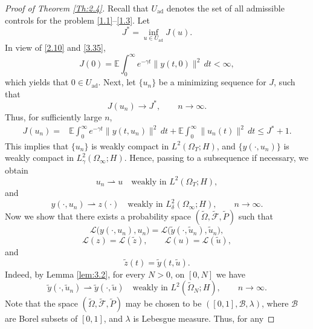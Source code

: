 \documentclass[a4paper,12pt]{article}
\numberwithin{equation}{section}
\begin{document}
\begin{proof}[Proof of Theorem \ref{Th:2.4}]
Recall that $U_{\mathrm{ad}}$ denotes the set of all admissible controls
for the problem \eqref{1.1}--\eqref{1.3}. Let
\[
J^*
=
\inf_{u\in U_{\mathrm{ad}}}J(u).
\] 
In view of \eqref{2.10} and
\eqref{3.35},
\[
J(0)
=
\mathbb{E}\int_0^\infty
e^{-\gamma t}
\|y(t,0)\|^2\,dt
<
\infty,
\]
which yields that $0 \in U_{\mathrm{ad}}$. Next, let $\{u_n\}$ be a minimizing sequence for $J$, such that
\begin{equation}
J(u_n)
\to
J^*,
\qquad n\to\infty.
\label{4.18}
\end{equation}
Thus, for sufficiently large $n$,
\begin{equation}
\begin{aligned}
J(u_n)
={}&
\mathbb{E}\int_0^\infty
e^{-\gamma t}
\|y(t,u_n)\|^2\,dt
+
\mathbb{E}\int_0^\infty
\|u_n(t)\|^2\,dt 
\leq
J^*+1.
\end{aligned}
\label{4.19}
\end{equation}
This implies that $\{u_n\}$ is weakly compact in
$L^2(\Omega_T;H)$, and
$\{y(\cdot,u_n)\}$ is weakly compact in
$L_\gamma^2(\Omega_\infty;H)$. Hence, passing to a subsequence if
necessary, we obtain
\begin{equation}
u_n
\rightharpoonup
u
\quad\text{weakly in }
L^2(\Omega_T;H),
\end{equation}
and
\begin{equation}
y(\cdot,u_n)
\rightharpoonup
z(\cdot)
\quad\text{weakly in }
L_\delta^2(\Omega_\infty;H),
\qquad n\to\infty.
\label{4.20}
\end{equation}
Now we show that there exists a probability space
$(\widetilde{\Omega},\widetilde{\mathcal{F}},\widetilde{P})$ such that
\[
\mathcal{L}\bigl(y(\cdot,u_n),u_n\bigr)
=
\mathcal{L}\bigl(\widetilde{y}(\cdot,\widetilde{u}_n),
\widetilde{u}_n\bigr),
\]
\[
\mathcal{L}(z)=\mathcal{L}(\widetilde{z}),
\qquad
\mathcal{L}(u)=\mathcal{L}(\widetilde{u}),
\]
and
\[
\widetilde{z}(t)
=
\widetilde{y}(t,\widetilde{u}).
\]
Indeed, by Lemma \ref{lem:3.2}, for every $N>0$, on $[0,N]$ we have
\begin{equation}
\widetilde{y}(\cdot,\widetilde{u}_n)
\rightharpoonup
\widetilde{y}(\cdot,\widetilde{u})
\quad\text{weakly in }
L^2(\widetilde{\Omega}_N;H),
\qquad n\to\infty.
\end{equation}
Note that the space $(\widetilde{\Omega}, \widetilde{\mathcal{F}}, \widetilde{P})$ may be chosen to be $([0,1], \mathcal{B}, \lambda)$, where $\mathcal{B}$ are Borel subsets of $[0,1]$, and $\lambda$ is Lebesgue measure. Thus, for any

\end{proof}
\end{document}
